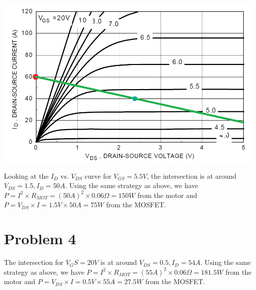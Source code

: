 \documentclass{article}
\begin{document}
{\centering
\includegraphics[scale=0.33]{images-worksheet2-solutions/loadline}
\\}

Looking at the $I_D$ vs. $V_{DS}$ curve for $V_{GS}=5.5V$, the intersection is at around $V_{DS}=1.5, I_D=50A$. Using the same strategy as above, we have $P=I^2 \times R_{MOT}=(50A)^2 \times 0.06\Omega=150W$ from the motor and $P=V_{DS} \times I=1.5V \times 50A=75W$ from the MOSFET.

\section{Problem 4}

The intersection for $V_GS=20V$ is at around $V_{DS}=0.5, I_D=54A$. Using the same strategy as above, we have $P=I^2 \times R_{MOT}=(55A)^2 \times 0.06\Omega=181.5W$ from the motor and $P=V_{DS} \times I=0.5V \times 55A=27.5W$ from the MOSFET.
\end{document}
